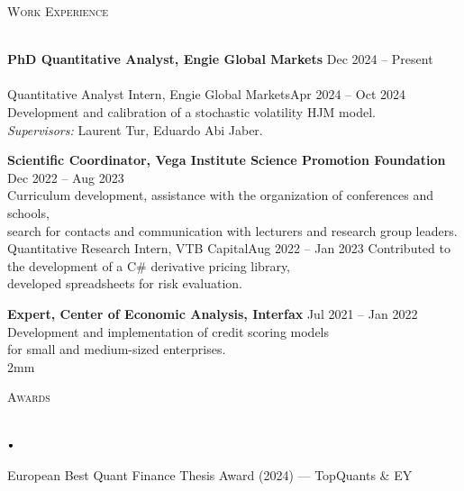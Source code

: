 \documentclass[11pt]{article}
\newcommand{\lineunder}{\vspace*{-8pt} \\ \hspace*{-18pt} \hrulefill \\}
\newcommand{\header}[1]{{\hspace*{-15pt}\vspace*{6pt} \textsc{#1}} \vspace*{-6pt} \lineunder}
\newcommand{\lbt}{\,\begin{picture}(-1,1)(-1,-3)\circle*{3}\end{picture}\ }
\newenvironment{achievements}{
    \begin{list}{$\lbt$}{
        \topsep 0pt
        \itemsep 0pt
        \addtolength{\leftmargin}{-0.1in}
    }
}
{
    \vspace*{4pt}
    \end{list}
}
\newcommand{\schoolwithcourses}[4]{
 \textbf{#1} \hfill{#2}\\
    #3\\
\vspace*{5pt}
}
\begin{document}
\header{Work Experience}

\vspace{2mm}
\schoolwithcourses{PhD Quantitative Analyst, Engie Global Markets}{Dec 2024 -- Present}
{}

\schoolwithcourses{Quantitative Analyst Intern, Engie Global Markets}{Apr 2024 -- Oct 2024}
{Development and calibration of a stochastic volatility HJM model. \\
{\it Supervisors:} Laurent Tur, Eduardo Abi Jaber.}

\schoolwithcourses{Scientific Coordinator, Vega Institute Science Promotion Foundation}{Dec 2022 -- Aug 2023}
{Curriculum development, assistance with the organization of conferences and schools, \\
search for contacts and communication with lecturers and research group leaders.}

\schoolwithcourses{Quantitative Research Intern, VTB Capital}{Aug 2022 -- Jan 2023}
{Contributed to the development of a C\# derivative pricing library, \\
developed spreadsheets for risk evaluation.}

\schoolwithcourses{Expert, Center of Economic Analysis, Interfax}{Jul 2021 -- Jan 2022}
{Development and implementation of credit scoring models \\
for small and medium-sized enterprises.}

\vspace{2mm}

\header{Awards}
\begin{achievements}
    \item European Best Quant Finance Thesis Award (2024) — TopQuants \& EY
\end{achievements}
\end{document}
